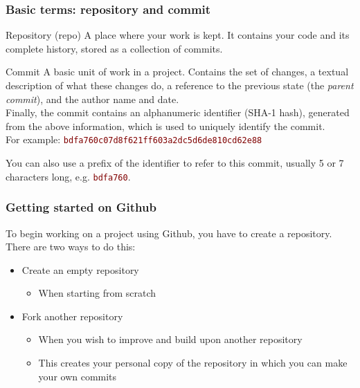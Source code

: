 \begin{frame}

\frametitle{Basic terms: repository and commit}
\begin{block}{Repository (repo)}
	A place where your work is kept. It contains your code and its complete history, stored as a collection of commits.
\end{block}

\begin{block}{Commit}
	A basic unit of work in a project. Contains the set of changes, a textual description of what these changes do, a reference to the previous state (the \textit{parent commit}), and the author name and date.\\ \smallskip Finally, the commit contains an alphanumeric identifier (SHA-1 hash), generated from the above information, which is used to uniquely identify the commit. \\For example: \textcolor{Maroon}{\texttt{bdfa760c07d8f621ff603a2dc5d6de810cd62e88}}
\smallskip

You can also use a prefix of the identifier to refer to this commit, usually 5 or 7 characters long, e.g. \textcolor{Maroon}{\texttt{bdfa760}}.
\end{block}
\end{frame}


\begin{frame}

\frametitle{Getting started on Github}

To begin working on a project using Github, you have to create a repository. There are two ways to do this:


\begin{itemize}
	\item Create an empty repository
	\begin{itemize}
	\item When starting from scratch
	\end{itemize}	
	
	\medskip
	\item Fork another repository
	\begin{itemize}
	\item When you wish to improve and build upon another repository
	\item This creates your personal copy of the repository in which you can make your own commits
	\end{itemize}
\end{itemize}

\end{frame}

